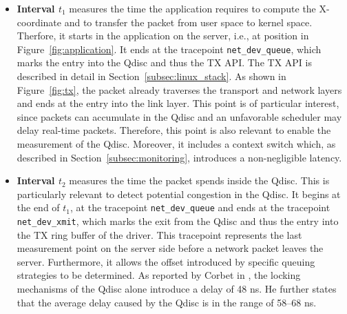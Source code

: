 \begin{itemize}
    \item \textbf{Interval $t_1$}\label{itm:t1} measures the time the application requires to compute the X-coordinate and to transfer the packet from user space to kernel space.  
          Therfore, it starts in the application on the server, i.e., at position  in Figure~\ref{fig:application}.  
          It ends at the tracepoint \texttt{net\_dev\_queue}, which marks the entry into the \ac{Qdisc} and thus the TX API.  
          The TX API is described in detail in Section~\ref{subsec:linux_stack}.  
          As shown in Figure~\ref{fig:tx}, the packet already traverses the transport and network layers and ends at the entry into the link layer.  
          This point is of particular interest, since packets can accumulate in the \ac{Qdisc} and an unfavorable scheduler may delay real-time packets.  
          Therefore, this point is also relevant to enable the measurement of the \ac{Qdisc}.  
          Moreover, it includes a context switch which, as described in Section~\ref{subsec:monitoring}, introduces a non-negligible latency.  

    \item \textbf{Interval $t_2$}\label{itm:t2} measures the time the packet spends inside the \ac{Qdisc}.  
          This is particularly relevant to detect potential congestion in the \ac{Qdisc}. 
          It begins at the end of $t_1$, at the tracepoint \texttt{net\_dev\_queue} and ends at the tracepoint \texttt{net\_dev\_xmit}, which marks the exit from the \ac{Qdisc} and thus the entry into the TX ring buffer of the driver.  
          This tracepoint represents the last measurement point on the server side before a network packet leaves the server.  
          Furthermore, it allows the offset introduced by specific queuing strategies to be determined.  
          As reported by Corbet in \cite{qdisc}, the locking mechanisms of the \ac{Qdisc} alone introduce a delay of 48 ns.  
          He further states that the average delay caused by the \ac{Qdisc} is in the range of 58--68 ns.  


\end{itemize}
